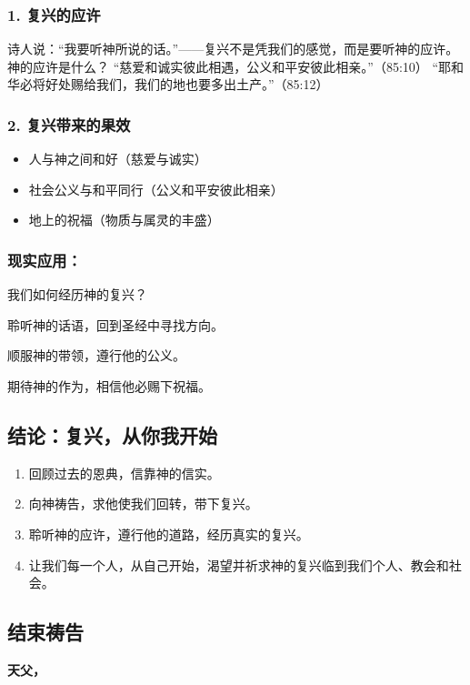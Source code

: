 \documentclass[a4paper, 12pt]{article}
\begin{document}
\subsubsection*{1. 复兴的应许}
诗人说：“我要听神所说的话。”——复兴不是凭我们的感觉，而是要听神的应许。
神的应许是什么？
“慈爱和诚实彼此相遇，公义和平安彼此相亲。”（85:10）
“耶和华必将好处赐给我们，我们的地也要多出土产。”（85:12）
\subsubsection*{2. 复兴带来的果效}
\begin{itemize}
    \item 人与神之间和好（慈爱与诚实）
    \item 社会公义与和平同行（公义和平安彼此相亲）

    \item 地上的祝福（物质与属灵的丰盛）

\end{itemize}

\subsubsection*{现实应用：}

我们如何经历神的复兴？

聆听神的话语，回到圣经中寻找方向。

顺服神的带领，遵行他的公义。

期待神的作为，相信他必赐下祝福。
\subsection*{结论：复兴，从你我开始}
\begin{enumerate}
    \item 回顾过去的恩典，信靠神的信实。

    \item 向神祷告，求他使我们回转，带下复兴。

    \item 聆听神的应许，遵行他的道路，经历真实的复兴。

    \item 让我们每一个人，从自己开始，渴望并祈求神的复兴临到我们个人、教会和社会。

\end{enumerate}




\subsection*{结束祷告}
\textbf{天父，}
\end{document}
